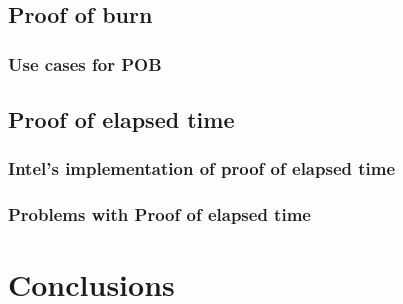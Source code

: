 \documentclass{acm_proc_article-sp}
\begin{document}
\subsection{Proof of burn}


\subsubsection{Use cases for POB}


\subsection{Proof of elapsed time}


\subsubsection{Intel's implementation of proof of elapsed time}


\subsubsection{Problems with Proof of elapsed time}


\section{Conclusions}






\end{document}
